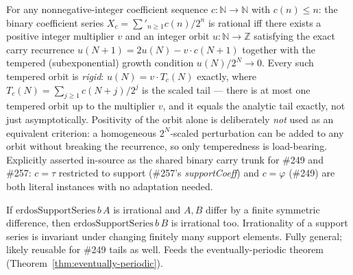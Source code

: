 \begin{thm}
\label{thm:tempered-orbit-rigidity}
For any nonnegative-integer coefficient sequence $c:\mathbb N\to\mathbb N$ with $c(n)\le
n$: the binary coefficient series $X_c = \sum'_{n\ge 1} c(n)/2^n$ is rational iff there
exists a positive integer multiplier $v$ and an integer orbit $u:\mathbb N\to\mathbb Z$
satisfying the exact carry recurrence $u(N{+}1)=2u(N)-v\cdot c(N{+}1)$ together with the
tempered (subexponential) growth condition $u(N)/2^N\to 0$. Every such tempered orbit is
\emph{rigid}: $u(N) = v\cdot T_c(N)$ exactly, where $T_c(N)=\sum_{j\ge 1} c(N{+}j)/2^j$ is
the scaled tail — there is at most one tempered orbit up to the multiplier $v$, and it
equals the analytic tail exactly, not just asymptotically. Positivity of the orbit alone
is deliberately \emph{not} used as an equivalent criterion: a homogeneous $2^N$-scaled
perturbation can be added to any orbit without breaking the recurrence, so only
temperedness is load-bearing. Explicitly asserted in-source as the shared binary carry
trunk for \#249 and \#257: $c=\tau$ restricted to support (\#257's \emph{supportCoeff})
and $c=\varphi$ (\#249) are both literal instances with no adaptation needed.
\par{}
\end{thm}

\begin{lem}
\label{lem:tail-transfer}
If $\mathrm{erdosSupportSeries}\,b\,A$ is irrational and $A,B$ differ by a finite
symmetric difference, then $\mathrm{erdosSupportSeries}\,b\,B$ is irrational too.
Irrationality of a support series is invariant under changing finitely many support
elements. Fully general; likely reusable for \#249 tails as well. Feeds the
eventually-periodic theorem (Theorem~\ref{thm:eventually-periodic}).
\par{}
\end{lem}

